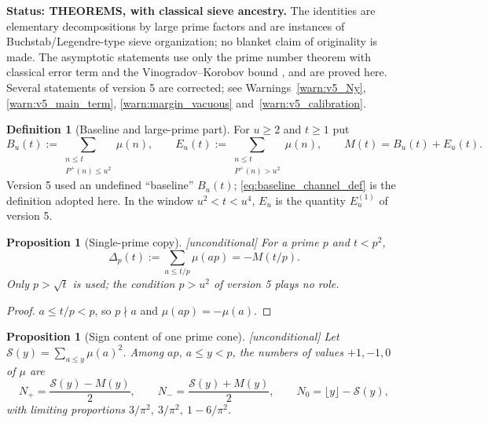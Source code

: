 \documentclass[11pt]{amsart}
\numberwithin{equation}{section}
\theoremstyle{plain}
\newtheorem{proposition}[theorem]{Proposition}
\theoremstyle{definition}
\newtheorem{definition}[theorem]{Definition}
\theoremstyle{remark}
\newcommand{\Pp}{P^{+}}
\newcommand{\Sq}{\mathcal{S}}
\begin{document}
\noindent\textbf{Status: THEOREMS, with classical sieve ancestry.} The
identities are elementary decompositions by large prime factors and are
instances of Buchstab/Legendre-type sieve organization; no blanket claim of
originality is made. The asymptotic statements use only the prime number
theorem with classical error term and the Vinogradov--Korobov bound
\cite{MontgomeryVaughan2007,Walfisz1963}, and are proved here. Several
statements of version 5 are corrected; see
Warnings~\ref{warn:v5_Ny}, \ref{warn:v5_main_term},
\ref{warn:margin_vacuous} and~\ref{warn:v5_calibration}.

\begin{definition}[Baseline and large-prime part]
\label{def:baseline_channel}
For $u\ge2$ and $t\ge1$ put
\begin{equation}
\label{eq:baseline_channel_def}
  B_u(t):=\sum_{\substack{n\le t\\ \Pp(n)\le u^2}}\mu(n),\qquad
  E_u(t):=\sum_{\substack{n\le t\\ \Pp(n)>u^2}}\mu(n),\qquad
  M(t)=B_u(t)+E_u(t).
\end{equation}
Version 5 used an undefined ``baseline'' $B_u(t)$; \eqref{eq:baseline_channel_def}
is the definition adopted here. In the window $u^2<t<u^4$, $E_u$ is the
quantity $E_u^{(1)}$ of version 5.
\end{definition}

\begin{proposition}[Single-prime copy]
\label{prop:single_prime_copy}
\emph{[unconditional]} For a prime $p$ and $t<p^2$,
\begin{equation}
\label{eq:single-prime-copy}
  \Delta_p(t):=\sum_{a\le t/p}\mu(ap)=-M(t/p).
\end{equation}
Only $p>\sqrt t$ is used; the condition $p>u^2$ of version 5 plays no role.
\end{proposition}

\begin{proof}
$a\le t/p<p$, so $p\nmid a$ and $\mu(ap)=-\mu(a)$.
\end{proof}

\begin{proposition}[Sign content of one prime cone]
\label{prop:prime-cone-signs}
\emph{[unconditional]} Let $\Sq(y)=\sum_{a\le y}\mu(a)^2$. Among $ap$,
$a\le y<p$, the numbers of values $+1,-1,0$ of $\mu$ are
\begin{equation}
\label{eq:cone_counts}
  N_+=\frac{\Sq(y)-M(y)}{2},\qquad N_-=\frac{\Sq(y)+M(y)}{2},\qquad
  N_0=\lfloor y\rfloor-\Sq(y),
\end{equation}
with limiting proportions $3/\pi^2,\ 3/\pi^2,\ 1-6/\pi^2$.
\end{proposition}
\end{document}
